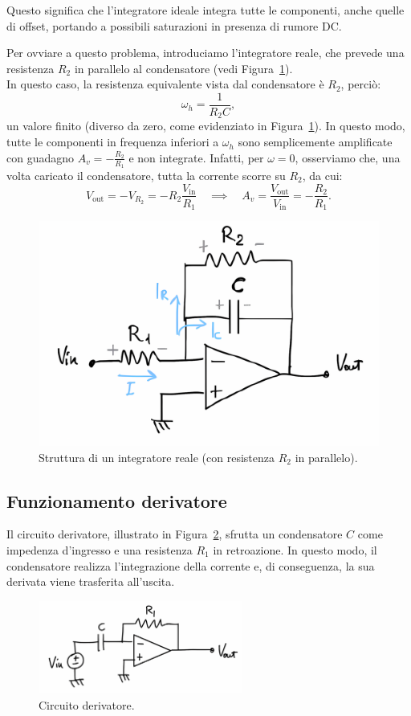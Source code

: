 Questo significa che l’integratore ideale integra tutte le componenti, anche quelle di offset, portando a possibili saturazioni in presenza di rumore DC.

Per ovviare a questo problema, introduciamo l’integratore reale, che prevede una resistenza \( R_2 \) in parallelo al condensatore (vedi Figura~\ref{fig:integratore_reale}).\\[2mm]

In questo caso, la resistenza equivalente vista dal condensatore è \( R_2 \), perciò:
\[
\omega_h = \frac{1}{R_2 C},
\]
un valore finito (diverso da zero, come evidenziato in Figura~\ref{fig:integratore_reale}). In questo modo, tutte le componenti in frequenza inferiori a \( \omega_h \) sono semplicemente amplificate con guadagno \( A_v = -\frac{R_2}{R_1} \) e non integrate. Infatti, per \( \omega = 0 \), osserviamo che, una volta caricato il condensatore, tutta la corrente scorre su \( R_2 \), da cui:
\[
V_{\text{out}} = -V_{R_2} = -R_2 \frac{V_{\text{in}}}{R_1} \quad \implies \quad A_v = \frac{V_{\text{out}}}{V_{\text{in}}} = -\frac{R_2}{R_1}.
\]
\begin{figure}[H]
    \centering
    \includegraphics[width=0.5\linewidth]{images/1.3.1.3.png}
    \caption{Struttura di un integratore reale (con resistenza \( R_2 \) in parallelo).}
    \label{fig:integratore_reale}
\end{figure}
\newpage

\subsection{Funzionamento derivatore}

Il circuito derivatore, illustrato in Figura~\ref{fig:derivatore}, sfrutta un condensatore \( C \) come impedenza d’ingresso e una resistenza \( R_1 \) in retroazione. In questo modo, il condensatore realizza l’integrazione della corrente e, di conseguenza, la sua derivata viene trasferita all’uscita.\\[2mm]
\begin{figure}[H]
    \centering
    \includegraphics[width=0.6\textwidth]{images/1.3.2.1.png}
    \caption{Circuito derivatore.}
    \label{fig:derivatore}
\end{figure}

